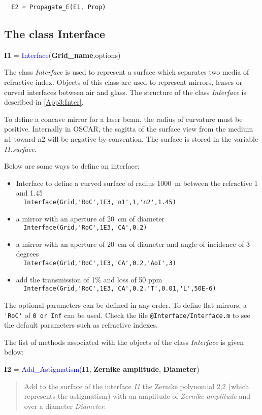 \verb?  E2 = Propagate_E(E1, Prop) ?

\subsection{The class Interface}
\textbf{I1} = \textcolor{blue}{Interface}(\textbf{Grid\_name},options)

The class \textsl{Interface} is used to represent a surface which separates two media of refractive index. Objects of this class are used to represent mirrors, lenses or curved interfaces between air and glass. The structure of the class \textsl{Interface} is described in \ref{App3:Inter}.

To define a concave mirror for a laser beam, the radius of curvature must be positive. Internally in OSCAR, the sagitta of the surface view from the medium n1 toward n2 will be negative by convention. The surface is stored in the variable \textsl{I1.surface}.

Below are some ways to define an interface:
\begin{itemize}
  \item Interface to define a curved surface of radius 1000~m between the refractive 1 and 1.45 \\
        \verb?  Interface(Grid,'RoC',1E3,'n1',1,'n2',1.45) ?
  \item a mirror with an aperture of 20~cm of diameter \\
      \verb?  Interface(Grid,'RoC',1E3,'CA',0.2) ?
   \item a mirror with an aperture of 20~cm of diameter and angle of incidence of 3 degrees \\
      \verb?  Interface(Grid,'RoC',1E3,'CA',0.2,'AoI',3) ?
  \item add the transmission of 1\% and loss of 50 ppm\\
        \verb?  Interface(Grid,'RoC',1E3,'CA',0.2.'T',0.01,'L',50E-6) ?
\end{itemize}
The optional parameters can be defined in any order. To define flat mirrors, a \verb?'RoC'? of \verb?0 or Inf? can be used. Check the file \verb?@Interface/Interface.m? to see the default parameters such as refractive indexes.

The list of methods associated with the objects of the class \textsl{Interface} is given below:

\noindent \textbf{I2} = \textcolor{blue}{Add\_Astigmatism}(\textbf{I1}, \textbf{Zernike amplitude}, \textbf{Diameter})
\vspace*{-0.2cm}
\begin{quote}
Add to the surface of the interface \textsl{I1} the Zernike polynomial 2,2 (which represents the astigmatism) with an amplitude of \textsl{Zernike amplitude} and over a diameter \textsl{Diameter}.
\end{quote}


